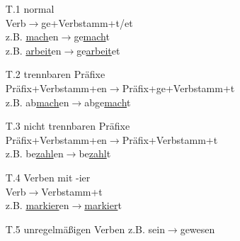 
\begin{itemize}
\item[T.1] normal \\
Verb$\rightarrow$ge+Verbstamm+t/et \\
z.B. \underline{mach}en$\rightarrow$ge\underline{mach}t \\
z.B. \underline{arbeit}en$\rightarrow$ge\underline{arbeit}et
\item[T.2] trennbaren Pr\"afixe \\
Pr\"afix+Verbstamm+en$\rightarrow$Pr\"afix+ge+Verbstamm+t \\
z.B. ab\underline{mach}en$\rightarrow$abge\underline{mach}t
\item[T.3] nicht trennbaren Pr\"afixe \\
Pr\"afix+Verbstamm+en$\rightarrow$Pr\"afix+Verbstamm+t \\
z.B. be\underline{zahl}en$\rightarrow$be\underline{zahl}t
\item[T.4] Verben mit -ier \\
Verb$\rightarrow$Verbstamm+t \\
z.B. \underline{markier}en$\rightarrow$\underline{markier}t
\item[T.5] unregelmäßigen Verben
z.B. sein$\rightarrow$gewesen
\end{itemize}
